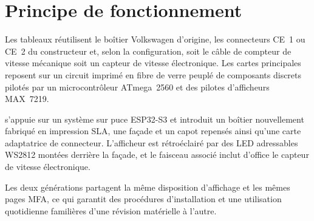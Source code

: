 \chapter{Principe de fonctionnement} \label{ch:operating-principle}

Les tableaux \ReplicaGenOne{} réutilisent le boîtier Volkswagen d'origine, les connecteurs CE~1 ou CE~2 du constructeur et, selon la configuration, soit le câble de compteur de vitesse mécanique soit un capteur de vitesse électronique.
Les cartes principales \ReplicaGenOneShort{} reposent sur un circuit imprimé en fibre de verre peuplé de composants discrets pilotés par un microcontrôleur ATmega~2560 et des pilotes d'afficheurs MAX~7219.

\ReplicaNextLong{} s'appuie sur un système sur puce ESP32-S3 et introduit un boîtier nouvellement fabriqué en impression SLA, une façade et un capot repensés ainsi qu'une carte adaptatrice de connecteur.
L'afficheur \ReplicaNextShort{} est rétroéclairé par des LED adressables WS2812 montées derrière la façade, et le faisceau associé inclut d'office le capteur de vitesse électronique.

Les deux générations partagent la même disposition d'affichage et les mêmes pages MFA, ce qui garantit des procédures d'installation et une utilisation quotidienne familières d'une révision matérielle à l'autre.
